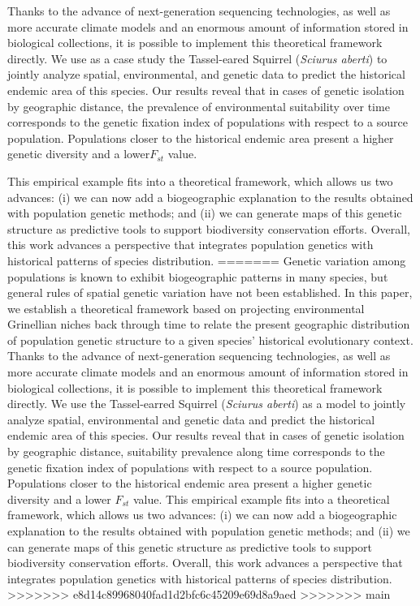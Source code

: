 \documentclass[
]{article}
\begin{document}
Thanks to the advance of next-generation sequencing technologies, as
well as more accurate climate models and an enormous amount of
information stored in biological collections, it is possible to
implement this theoretical framework directly. We use as a case study
the Tassel-eared Squirrel (\emph{Sciurus aberti}) to jointly analyze
spatial, environmental, and genetic data to predict the historical
endemic area of this species. Our results reveal that in cases of
genetic isolation by geographic distance, the prevalence of
environmental suitability over time corresponds to the genetic fixation
index of populations with respect to a source population. Populations
closer to the historical endemic area present a higher genetic diversity
and a lower\(F_{st}\) value.

This empirical example fits into a theoretical framework, which allows
us two advances: (i) we can now add a biogeographic explanation to the
results obtained with population genetic methods; and (ii) we can
generate maps of this genetic structure as predictive tools to support
biodiversity conservation efforts. Overall, this work advances a
perspective that integrates population genetics with historical patterns
of species distribution.
=======
Genetic variation among populations is known to exhibit biogeographic patterns in many species, but general rules of spatial genetic variation have not been established. In this paper, we establish a theoretical framework based on projecting environmental Grinellian niches back through time to relate the present geographic distribution of population genetic structure to a given species' historical evolutionary context. Thanks to the advance of next-generation sequencing technologies, as well as more accurate climate models and an enormous amount of information stored in biological collections, it is possible to implement this theoretical framework directly. We use the Tassel-earred Squirrel (\textit{Sciurus aberti}) as a model to jointly analyze spatial, environmental and genetic data and predict the historical endemic area of this species. Our results reveal that in cases of genetic isolation by
geographic distance, suitability prevalence along time corresponds to the genetic fixation
index of populations with respect to a source population. Populations closer to the historical endemic area present a higher genetic diversity and a lower \(F_{st}\) value. This empirical example fits into a theoretical framework, which allows us two advances: (i) we can now add a biogeographic explanation to the results obtained with population genetic methods; and (ii) we can generate maps of this genetic structure as predictive tools to support biodiversity conservation efforts. Overall, this work advances a perspective that integrates population genetics with historical patterns of species distribution.
>>>>>>> e8d14c89968040fad1d2bfc6c45209e69d8a9aed
>>>>>>> main
\end{document}
